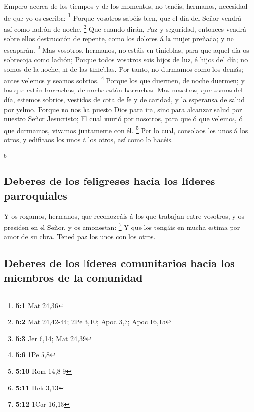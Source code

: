 Empero acerca de los tiempos y de los momentos, no
tenéis, hermanos, necesidad de que yo os escriba: \footnote{\textbf{5:1}
  Mat 24,36}  Porque vosotros sabéis bien, que el día del
Señor vendrá así como ladrón de noche, \footnote{\textbf{5:2} Mat
  24,42-44; 2Pe 3,10; Apoc 3,3; Apoc 16,15}  Que cuando
dirán, Paz y seguridad, entonces vendrá sobre ellos destrucción de
repente, como los dolores á la mujer preñada; y no escaparán.
\footnote{\textbf{5:3} Jer 6,14; Mat 24,39}  Mas vosotros,
hermanos, no estáis en tinieblas, para que aquel día os sobrecoja como
ladrón;  Porque todos vosotros sois hijos de luz, é hijos
del día; no somos de la noche, ni de las tinieblas.  Por
tanto, no durmamos como los demás; antes velemos y seamos sobrios.
\footnote{\textbf{5:6} 1Pe 5,8}  Porque los que duermen,
de noche duermen; y los que están borrachos, de noche están borrachos.
 Mas nosotros, que somos del día, estemos sobrios,
vestidos de cota de fe y de caridad, y la esperanza de salud por yelmo.
 Porque no nos ha puesto Dios para ira, sino para alcanzar
salud por nuestro Señor Jesucristo;  El cual murió por
nosotros, para que ó que velemos, ó que durmamos, vivamos juntamente con
él. \footnote{\textbf{5:10} Rom 14,8-9}  Por lo cual,
consolaos los unos á los otros, y edificaos los unos á los otros, así
como lo hacéis.

\footnote{\textbf{5:11} Heb 3,13}

\hypertarget{deberes-de-los-feligreses-hacia-los-luxedderes-parroquiales}{%
\subsection{Deberes de los feligreses hacia los líderes
parroquiales}\label{deberes-de-los-feligreses-hacia-los-luxedderes-parroquiales}}

 Y os rogamos, hermanos, que reconozcáis á los que
trabajan entre vosotros, y os presiden en el Señor, y os amonestan:
\footnote{\textbf{5:12} 1Cor 16,18}  Y que los tengáis en
mucha estima por amor de su obra. Tened paz los unos con los otros.

\hypertarget{deberes-de-los-luxedderes-comunitarios-hacia-los-miembros-de-la-comunidad}{%
\subsection{Deberes de los líderes comunitarios hacia los miembros de la
comunidad}\label{deberes-de-los-luxedderes-comunitarios-hacia-los-miembros-de-la-comunidad}}

